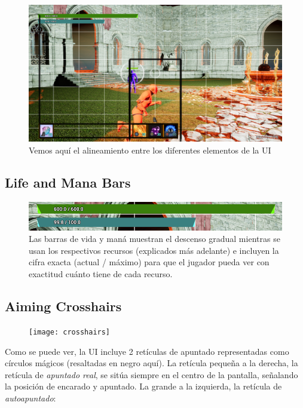 \documentclass[12pt]{report}
\begin{document}
\begin{figure}[b]
    \centering
    \includegraphics[width=1\textwidth]{alignments}
    \caption{Vemos aquí el alineamiento entre los diferentes elementos de la UI}
\end{figure}

\subsection{Life and Mana Bars}

\begin{figure}[H]
    \centering
    \includegraphics[width=1\textwidth]{life_mana_bars}
    \caption{Las barras de vida y maná muestran el descenso gradual mientras se usan los respectivos recursos (explicados más adelante) e incluyen la cifra exacta (actual / máximo) para que el jugador pueda ver con exactitud cuánto tiene de cada recurso.}
\end{figure}

\subsection{Aiming Crosshairs}

\begin{figure}[H]
    \centering
    \texttt{[image: crosshairs]}
\end{figure}

Como se puede ver, la UI incluye 2 retículas de apuntado representadas como círculos mágicos (resaltadas en negro aquí). La retícula pequeña a la derecha, la retícula de \textit{apuntado real}, se sitúa siempre en el centro de la pantalla, señalando la posición de encarado y apuntado. La grande a la izquierda, la retícula de \textit{autoapuntado}:
\end{document}

